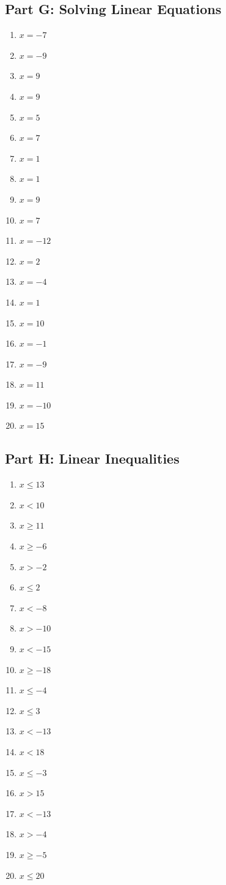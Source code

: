 \documentclass[11pt]{article}
\begin{document}
\subsection*{Part G: Solving Linear Equations}
\begin{multicols}{3}
\begin{enumerate}
  \item $x = -7$
  \item $x = -9$
  \item $x = 9$
  \item $x = 9$
  \item $x = 5$
  \item $x = 7$
  \item $x = 1$
  \item $x = 1$
  \item $x = 9$
  \item $x = 7$
  \item $x = -12$
  \item $x = 2$
  \item $x = -4$
  \item $x = 1$
  \item $x = 10$
  \item $x = -1$
  \item $x = -9$
  \item $x = 11$
  \item $x = -10$
  \item $x = 15$
\end{enumerate}
\end{multicols}
\subsection*{Part H: Linear Inequalities}
\begin{multicols}{3}
\begin{enumerate}
  \item $x \le 13$
  \item $x < 10$
  \item $x \ge 11$
  \item $x \ge -6$
  \item $x > -2$
  \item $x \le 2$
  \item $x < -8$
  \item $x > -10$
  \item $x < -15$
  \item $x \ge -18$
  \item $x \le -4$
  \item $x \le 3$
  \item $x < -13$
  \item $x < 18$
  \item $x \le -3$
  \item $x > 15$
  \item $x < -13$
  \item $x > -4$
  \item $x \ge -5$
  \item $x \le 20$
\end{enumerate}
\end{multicols}
\end{document}
